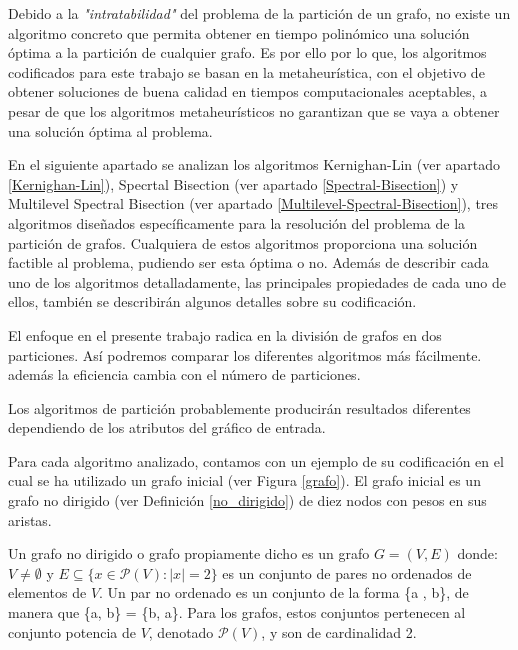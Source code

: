 Debido a la \textit{"intratabilidad"} del problema de la partición de un grafo, no existe un algoritmo concreto que permita obtener en tiempo polinómico una solución óptima a la partición de cualquier grafo. Es por ello por lo que, los algoritmos codificados para este trabajo se basan en la metaheurística, con el objetivo de obtener soluciones de buena calidad en tiempos computacionales aceptables, a pesar de que los algoritmos metaheurísticos no garantizan que se vaya a obtener una solución óptima al problema.

En el siguiente apartado se analizan los algoritmos Kernighan-Lin\cite{KernighanLin} (ver apartado \ref{Kernighan-Lin}), Specrtal Bisection (ver apartado \ref{Spectral-Bisection}) y Multilevel Spectral Bisection (ver apartado \ref{Multilevel-Spectral-Bisection}), tres algoritmos diseñados específicamente para la resolución del problema de la partición de grafos. Cualquiera de estos algoritmos proporciona una solución factible al problema, pudiendo ser esta óptima o no. Además de describir cada uno de los algoritmos detalladamente, las principales propiedades de cada uno de ellos, también se describirán algunos detalles sobre su codificación.

El enfoque en el presente trabajo radica en la división de grafos en dos particiones. Así podremos comparar los diferentes algoritmos más fácilmente. además la eficiencia cambia con el número de particiones.

Los algoritmos de partición probablemente producirán resultados diferentes dependiendo de los atributos del gráfico de entrada.

Para cada algoritmo analizado, contamos con un ejemplo de su codificación en el cual se ha utilizado un grafo inicial (ver Figura \ref{grafo}). El grafo inicial es un grafo no dirigido (ver Definición \ref{no_dirigido}) de diez nodos con pesos en sus aristas.

\begin{mydef}\label{no_dirigido}
	Un grafo no dirigido o grafo propiamente dicho es un grafo $G = (V , E)$ donde: $V\neq \emptyset$ y $E\subseteq \{x\in \mathcal P(V):|x|=2\}$ es un conjunto de pares no ordenados de elementos de $V$. Un par no ordenado es un conjunto de la forma \{a , b\}, de manera que \{a, b\} = \{b, a\}. Para los grafos, estos conjuntos pertenecen al conjunto potencia de $V$, denotado $\mathcal P(V)$, y son de cardinalidad 2. 
\end{mydef}

